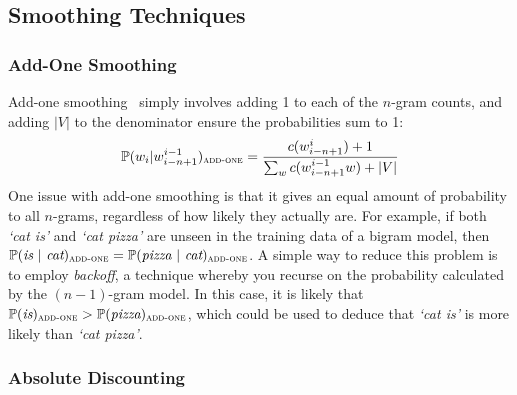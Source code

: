 \documentclass[a4paper, 12pt]{report}
\newcommand{\tit}[1]{\textit{#1}}
\begin{document}
\subsection{Smoothing Techniques}

\subsubsection{Add-One Smoothing}

Add-one smoothing~\cite{add1_smoothing:johnson1932} simply involves adding 1 to each of the $n$-gram counts, and adding $|V|$ to the denominator ensure the probabilities sum to 1:
\begin{gather}
	\mathbb{P}(w_i | w_{i - n + 1}^{i - 1})_{\text{\scshape add-one}} = \frac{c(w_{i - n + 1}^{i}) + 1}{\sum_w c(w_{i - n + 1}^{i - 1}w) + |V|}
\end{gather}
One issue with add-one smoothing is that it gives an equal amount of probability to all $n$-grams, regardless of how likely they actually are. For example, if both \tit{`cat is'} and \tit{`cat pizza'} are unseen in the training data of a bigram model, then $\mathbb{P}(\tit{is}\ |\ \tit{cat})_{\text{\scshape add-one}} = \mathbb{P}(\tit{pizza}\ |\ \tit{cat})_{\text{\scshape add-one}}$. A simple way to reduce this problem is to employ \tit{backoff}, a technique whereby you recurse on the probability calculated by the $(n - 1)$-gram model. In this case, it is likely that $\mathbb{P}(\tit{is})_{\text{\scshape add-one}} > \mathbb{P}(\tit{pizza})_{\text{\scshape add-one}}$, which could be used to deduce that \tit{`cat is'} is more likely than \tit{`cat pizza'}.

\subsubsection{Absolute Discounting}
\end{document}

